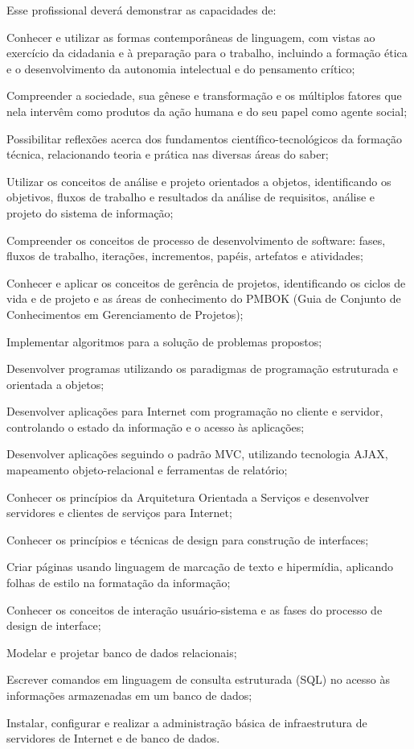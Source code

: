 \documentclass[
	12pt,				%
	openright,			%
	twoside,			%
	a4paper,			%
	chapter=TITLE,		%
	english,			%
	french,				%
	spanish,			%
	brazil,				%
	]{abntex2}
\begin{document}
Esse profissional deverá demonstrar as capacidades de:
\begin{alineas}
\item Conhecer e utilizar as formas contemporâneas de linguagem, com vistas ao exercício da cidadania e à preparação para o trabalho, incluindo a formação ética e o desenvolvimento da autonomia intelectual e do pensamento crítico;
\item  Compreender a sociedade, sua gênese e transformação e os múltiplos fatores que nela intervêm como produtos da ação humana e do seu papel como agente social;
\item  Possibilitar reflexões acerca dos fundamentos científico-tecnológicos da formação técnica, relacionando teoria e prática nas diversas áreas do saber;
\item  Utilizar os conceitos de análise e projeto orientados a objetos, identificando os objetivos, fluxos de trabalho e resultados da análise de requisitos, análise e projeto do sistema de informação;
\item  Compreender os conceitos de processo de desenvolvimento de software: fases, fluxos de trabalho, iterações, incrementos, papéis, artefatos e atividades;
\item  Conhecer e aplicar os conceitos de gerência de projetos, identificando os ciclos de vida e de projeto e as áreas de conhecimento do PMBOK (Guia de Conjunto de Conhecimentos em Gerenciamento de Projetos);
\item  Implementar algoritmos para a solução de problemas propostos;
\item  Desenvolver programas utilizando os paradigmas de programação estruturada e
orientada a objetos;
\item  Desenvolver aplicações para Internet com programação no cliente e servidor, controlando o estado da informação e o acesso às aplicações;
\item  Desenvolver aplicações seguindo o padrão MVC, utilizando tecnologia AJAX, mapeamento objeto-relacional e ferramentas de relatório;
\item  Conhecer os princípios da Arquitetura Orientada a Serviços e desenvolver servidores e clientes de serviços para Internet;
\item  Conhecer os princípios e técnicas de design para construção de interfaces;
\item  Criar páginas usando linguagem de marcação de texto e hipermídia, aplicando folhas de estilo na formatação da informação;
\item Conhecer os conceitos de interação usuário-sistema e as fases do processo de design de interface;
\item Modelar e projetar  banco de dados relacionais;
\item  Escrever comandos em linguagem de consulta estruturada (SQL) no acesso às
informações armazenadas em um banco de dados;
\item Instalar, configurar e realizar a administração básica de infraestrutura de servidores de Internet e de banco de dados.

\end{alineas}
\end{document}
